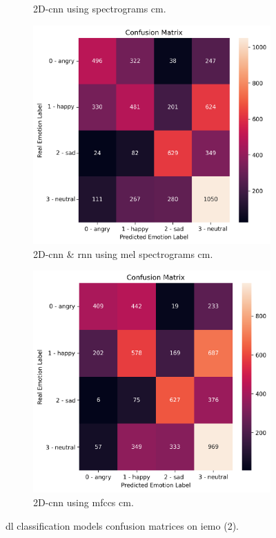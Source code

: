 \begin{figure}[H]
\begin{subfigure}{.5\textwidth}
		\caption{2D-\ac{cnn} using spectrograms \ac{cm}.}
	\end{subfigure}
	\newline
	\begin{subfigure}{.5\textwidth}
		\centering
		\includegraphics[width=.9\linewidth]{figs/appendix/feature_selection/LSTMMelSpec.png}
		\caption{2D-\ac{cnn} \& \ac{rnn} using mel spectrograms \ac{cm}.}
	\end{subfigure}%
	\begin{subfigure}{.5\textwidth}
		\centering
		\includegraphics[width=.9\linewidth]{figs/appendix/feature_selection/CNNMFCC.png}
		\caption{2D-\ac{cnn} using \ac{mfccs} \ac{cm}.}
	\end{subfigure}
	\caption{\ac{dl} classification models confusion matrices on \ac{iemo} (2).}
\end{figure}


